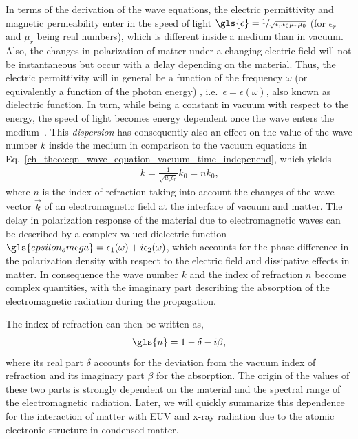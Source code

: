 In terms of the derivation of the wave equations, the electric permittivity and magnetic permeability enter in the speed of light $\gls{c} = \sfrac{1}{\sqrt{\epsilon_r \epsilon_0 \mu_r \mu_0}}$ (for $\epsilon_r$ and $\mu_r$ being real numbers), which is different inside a medium than in vacuum. Also, the changes in polarization of matter under a changing electric field will not be instantaneous but occur with a delay depending on the material. Thus, the electric permittivity will in general be a function of the frequency $\omega$ (or equivalently a function of the photon energy) , i.e.~$\epsilon = \epsilon(\omega)$, also known as dielectric function. In turn, while being a constant in vacuum with respect to the energy, the speed of light becomes energy dependent once the wave enters the medium~\cite{bergevin_interaction_2009}. This \emph{dispersion} has consequently also an effect on the value of the wave number $k$ inside the medium in comparison to the vacuum equations in Eq.~\eqref{ch_theo:eqn_wave_equation_vacuum_time_indepenend}, which yields
\begin{align}
 k = \frac{1}{\sqrt{\mu_r \epsilon_r}} k_0 = n k_0\text{,} \label{ch_theo:eqn_k_inside_medium}
\end{align}
where $n$ is the index of refraction taking into account the changes of the wave vector $\vec{k}$ of an electromagnetic field at the interface of vacuum and matter. The delay in polarization response of the material due to electromagnetic waves can be described by a complex valued dielectric function $\gls{epsilon_omega} = \epsilon_1(\omega) + i \epsilon_2(\omega)$, which accounts for the phase difference in the polarization density with respect to the electric field and dissipative effects in matter. In consequence the wave number $k$ and the index of refraction $n$ become complex quantities, with the imaginary part describing the absorption of the electromagnetic radiation during the propagation.

The index of refraction can then be written as,
\begin{align}
\gls{n} = 1 - \delta - i \beta \text{,} \label{ch_theo:eqn_n}
\end{align}
where its real part $\delta$ accounts for the deviation from the vacuum index of refraction and its imaginary part $\beta$ for the absorption. The origin of the values of these two parts is strongly dependent on the material and the spectral range of the electromagnetic radiation. Later, we will quickly summarize this dependence for the interaction of matter with EUV and x-ray radiation due to the atomic electronic structure in condensed matter.

